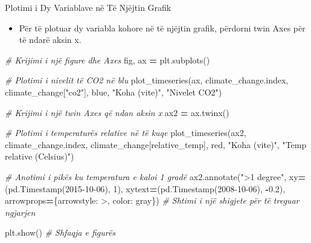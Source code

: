 \documentclass[
  ignorenonframetext,
]{beamer}
\newenvironment{Shaded}{\begin{snugshade}}{\end{snugshade}}
\newcommand{\CommentTok}[1]{\textcolor[rgb]{0.56,0.35,0.01}{\textit{#1}}}
\newcommand{\DecValTok}[1]{\textcolor[rgb]{0.00,0.00,0.81}{#1}}
\newcommand{\FloatTok}[1]{\textcolor[rgb]{0.00,0.00,0.81}{#1}}
\newcommand{\NormalTok}[1]{#1}
\newcommand{\OperatorTok}[1]{\textcolor[rgb]{0.81,0.36,0.00}{\textbf{#1}}}
\newcommand{\StringTok}[1]{\textcolor[rgb]{0.31,0.60,0.02}{#1}}
\providecommand{\tightlist}{%
  \setlength{\itemsep}{0pt}\setlength{\parskip}{0pt}}
\begin{document}
\begin{frame}[fragile]{Plotimi i Dy Variablave në Të Njëjtin Grafik}
\protect\hypertarget{plotimi-i-dy-variablave-nuxeb-tuxeb-njuxebjtin-grafik}{}
\begin{itemize}
\tightlist
\item
  Për të plotuar dy variabla kohore në të njëjtin grafik, përdorni twin
  Axes për të ndarë aksin x.
\end{itemize}


\begin{Shaded}
\begin{Highlighting}[]
\CommentTok{\# Krijimi i një figure dhe Axes}
\NormalTok{fig, ax }\OperatorTok{=}\NormalTok{ plt.subplots()}

\CommentTok{\# Plotimi i nivelit të CO2 në blu}
\NormalTok{plot\_timeseries(ax, climate\_change.index, climate\_change[}\StringTok{"co2"}\NormalTok{], }\StringTok{\textquotesingle{}blue\textquotesingle{}}\NormalTok{, }\StringTok{"Koha (vite)"}\NormalTok{, }\StringTok{"Nivelet CO2"}\NormalTok{)}

\CommentTok{\# Krijimi i një twin Axes që ndan aksin x}
\NormalTok{ax2 }\OperatorTok{=}\NormalTok{ ax.twinx()}

\CommentTok{\# Plotimi i temperaturës relative në të kuqe}
\NormalTok{plot\_timeseries(ax2, climate\_change.index, climate\_change[}\StringTok{\textquotesingle{}relative\_temp\textquotesingle{}}\NormalTok{], }\StringTok{\textquotesingle{}red\textquotesingle{}}\NormalTok{, }\StringTok{"Koha (vite)"}\NormalTok{, }\StringTok{"Temp relative (Celsius)"}\NormalTok{)}

\CommentTok{\# Anotimi i pikës ku temperatura e kaloi 1 gradë}
\NormalTok{ax2.annotate(}\StringTok{"\textgreater{}1 degree"}\NormalTok{, xy}\OperatorTok{=}\NormalTok{(pd.Timestamp(}\StringTok{\textquotesingle{}2015{-}10{-}06\textquotesingle{}}\NormalTok{), }\DecValTok{1}\NormalTok{), }
\NormalTok{             xytext}\OperatorTok{=}\NormalTok{(pd.Timestamp(}\StringTok{\textquotesingle{}2008{-}10{-}06\textquotesingle{}}\NormalTok{), }\OperatorTok{{-}}\FloatTok{0.2}\NormalTok{), }
\NormalTok{             arrowprops}\OperatorTok{=}\NormalTok{\{}\StringTok{\textquotesingle{}arrowstyle\textquotesingle{}}\NormalTok{: }\StringTok{\textquotesingle{}{-}\textgreater{}\textquotesingle{}}\NormalTok{, }\StringTok{\textquotesingle{}color\textquotesingle{}}\NormalTok{: }\StringTok{\textquotesingle{}gray\textquotesingle{}}\NormalTok{\})  }\CommentTok{\# Shtimi i një shigjete për të treguar ngjarjen}

\NormalTok{plt.show()  }\CommentTok{\# Shfaqja e figurës}
\end{Highlighting}
\end{Shaded}
\end{frame}
\end{document}
